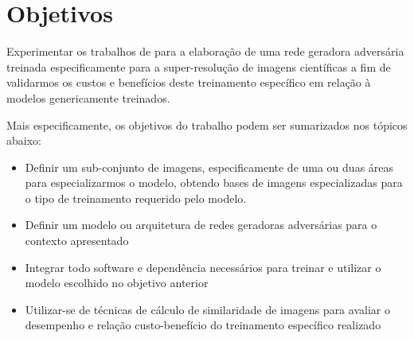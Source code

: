 \section{Objetivos}

Experimentar os trabalhos de  para a elaboração de uma rede geradora adversária treinada especificamente para a super-resolução de imagens científicas a fim de validarmos os custos e benefícios deste treinamento específico em relação à modelos genericamente treinados.

Mais especificamente, os objetivos do trabalho podem ser sumarizados nos tópicos abaixo:

\begin{itemize}

    \item Definir um sub-conjunto de imagens, especificamente de uma ou duas áreas para especializarmos o modelo, obtendo bases de imagens especializadas para o tipo de treinamento requerido pelo modelo.
    
    \item Definir um modelo ou arquitetura de redes geradoras adversárias para o contexto apresentado

    \item Integrar todo software e dependência necessários para treinar e utilizar o modelo escolhido no objetivo anterior
	
	\item Utilizar-se de técnicas de cálculo de similaridade de imagens para avaliar o desempenho e relação custo-benefício do treinamento específico realizado

\end{itemize}
 
